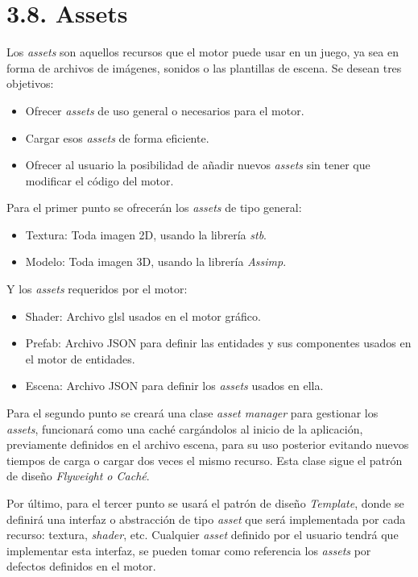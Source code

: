 \section*{3.8. Assets}\label{sec:assets}

Los \textit{assets} son aquellos recursos que el motor puede usar en un juego, ya sea en forma de archivos de imágenes, sonidos o las plantillas de escena.
Se desean tres objetivos:
\begin{itemize}
    \item Ofrecer \textit{assets} de uso general o necesarios para el motor.
    \item Cargar esos \textit{assets} de forma eficiente.
    \item Ofrecer al usuario la posibilidad de añadir nuevos \textit{assets} sin tener que modificar el código del motor.
\end{itemize}
Para el primer punto se ofrecerán los \textit{assets} de tipo general:
\begin{itemize}
    \item Textura: Toda imagen 2D, usando la librería \textit{stb}\cite{stb}.
    \item Modelo: Toda imagen 3D, usando la librería \textit{Assimp}\cite{assimp}.
\end{itemize}
Y los \textit{assets} requeridos por el motor:
\begin{itemize}
    \item Shader: Archivo \gls{glsl} usados en el motor gráfico.
    \item Prefab: Archivo JSON para definir las entidades y sus componentes usados en el motor de entidades.
    \item Escena: Archivo JSON para definir los \textit{assets} usados en ella.
\end{itemize}
Para el segundo punto se creará una clase \textit{asset manager} para gestionar los \textit{assets}, funcionará
como una caché cargándolos al inicio de la aplicación, previamente definidos en el archivo escena, para su uso posterior evitando nuevos tiempos de carga
o cargar dos veces el mismo recurso. Esta clase sigue el patrón de diseño \textit{Flyweight o Caché}\cite{flyweight-pattern}.

Por último, para el tercer punto se usará el patrón de diseño \textit{Template}\cite{template-pattern}, donde se definirá una interfaz o abstracción de tipo \textit{asset}
que será implementada por cada recurso: textura, \textit{shader}, etc. Cualquier \textit{asset} definido por el usuario tendrá que implementar esta interfaz, se pueden tomar como referencia los \textit{assets} por defectos definidos en el motor.
\newpage


